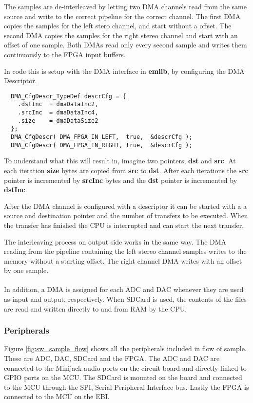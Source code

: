 The samples are de-interleaved by letting two DMA channels read from the same
source and write to the correct pipeline for the correct channel. The first DMA
copies the samples for the left stero channel, and start without a offset. The
second DMA copies the samples for the right stereo channel and start with an
offset of one sample. Both DMAs read only every second sample and writes them
continuously to the FPGA input buffers.

In code this is setup with the DMA interface in {\bf emlib}, by configuring the DMA Descriptor. 
\begin{lstlisting}
  DMA_CfgDescr_TypeDef descrCfg = {
    .dstInc  = dmaDataInc2,
    .srcInc  = dmaDataInc4,
    .size    = dmaDataSize2
  };
  DMA_CfgDescr( DMA_FPGA_IN_LEFT,  true,  &descrCfg );
  DMA_CfgDescr( DMA_FPGA_IN_RIGHT, true,  &descrCfg );
\end{lstlisting}
To understand what this will result in, imagine two pointers, {\bf dst} and {\bf src}. 
At each iteration {\bf size} bytes are copied from {\bf src} to {\bf dst}. After each
iterations the {\bf src} pointer is incremented by {\bf srcInc} bytes and the {\bf dst}
pointer is incremented by {\bf dstInc}. 

After the DMA channel is configured with a descriptor it can be started with a 
a source and destination pointer and the number of transfers to be executed. 
When the transfer has finished the CPU is interrupted and can start the next transfer.

The interleaving process on output side works in the same way. The DMA reading
from the pipeline containing the left stereo channel samples writes to the
memory without a starting offset. The right channel DMA writes with an offset by
one sample.

\paragraph{}
In addition, a DMA is assigned for each ADC and DAC whenever they are used as
input and output, respectively. When SDCard is used, the contents of the files
are read and written directly to and from RAM by the CPU.


\subsubsection{Peripherals}


Figure \ref{fig:sw_sample_flow} shows all the peripherals included in flow of sample. 
These are ADC, DAC, SDCard and the FPGA. The ADC and DAC are connected to the Minijack
audio ports on the circuit board and directly linked to GPIO ports on the MCU. The SDCard
is mounted on the board and connected to the MCU through the SPI, Serial Peripheral Interface
bus. Lastly the FPGA is connected to the MCU on the EBI.

